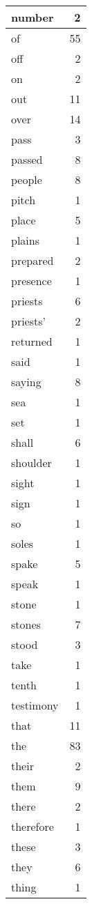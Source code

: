 \begin{center}
\begin{longtable}{l|r}
number & 2\\ \hline 
of & 55\\ \hline 
off & 2\\ \hline 
on & 2\\ \hline 
out & 11\\ \hline 
over & 14\\ \hline 
pass & 3\\ \hline 
passed & 8\\ \hline 
people & 8\\ \hline 
pitch & 1\\ \hline 
place & 5\\ \hline 
plains & 1\\ \hline 
prepared & 2\\ \hline 
presence & 1\\ \hline 
priests & 6\\ \hline 
priests' & 2\\ \hline 
returned & 1\\ \hline 
said & 1\\ \hline 
saying & 8\\ \hline 
sea & 1\\ \hline 
set & 1\\ \hline 
shall & 6\\ \hline 
shoulder & 1\\ \hline 
sight & 1\\ \hline 
sign & 1\\ \hline 
so & 1\\ \hline 
soles & 1\\ \hline 
spake & 5\\ \hline 
speak & 1\\ \hline 
stone & 1\\ \hline 
stones & 7\\ \hline 
stood & 3\\ \hline 
take & 1\\ \hline 
tenth & 1\\ \hline 
testimony & 1\\ \hline 
that & 11\\ \hline 
the & 83\\ \hline 
their & 2\\ \hline 
them & 9\\ \hline 
there & 2\\ \hline 
therefore & 1\\ \hline 
these & 3\\ \hline 
they & 6\\ \hline 
thing & 1\\ \hline 

\end{longtable}
\end{center}
